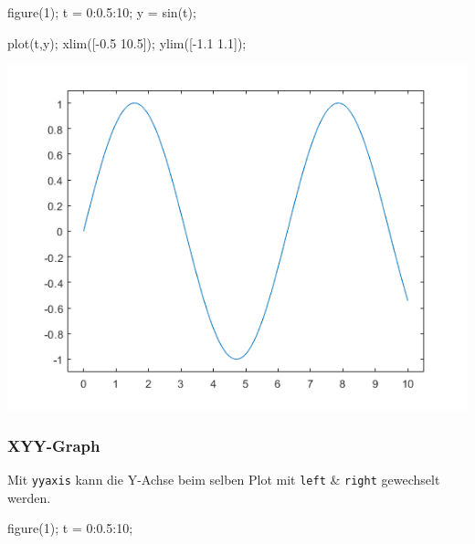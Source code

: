 \documentclass[
  10pt,
  a4paper,
  german]{article}
\newenvironment{Shaded}{}{}
\newcommand{\FloatTok}[1]{\textcolor[rgb]{0.00,0.36,0.77}{#1}}
\newcommand{\NormalTok}[1]{\textcolor[rgb]{0.14,0.16,0.18}{#1}}
\newcommand{\OperatorTok}[1]{\textcolor[rgb]{0.14,0.16,0.18}{#1}}
\newcommand{\VariableTok}[1]{\textcolor[rgb]{0.89,0.38,0.04}{#1}}
\numberwithin{equation}{section}
\begin{document}
\begin{multicols}{2}
\begin{Shaded}
\begin{Highlighting}[]
\VariableTok{figure}\NormalTok{(}\FloatTok{1}\NormalTok{)}\OperatorTok{;}
\VariableTok{t} \OperatorTok{=} \FloatTok{0}\OperatorTok{:}\FloatTok{0.5}\OperatorTok{:}\FloatTok{10}\OperatorTok{;}
\VariableTok{y} \OperatorTok{=} \VariableTok{sin}\NormalTok{(}\VariableTok{t}\NormalTok{)}\OperatorTok{;}

\VariableTok{plot}\NormalTok{(}\VariableTok{t}\OperatorTok{,}\VariableTok{y}\NormalTok{)}\OperatorTok{;}
\VariableTok{xlim}\NormalTok{([}\OperatorTok{{-}}\FloatTok{0.5} \FloatTok{10.5}\NormalTok{])}\OperatorTok{;}
\VariableTok{ylim}\NormalTok{([}\OperatorTok{{-}}\FloatTok{1.1} \FloatTok{1.1}\NormalTok{])}\OperatorTok{;}
\end{Highlighting}
\end{Shaded}

\includegraphics{images/plot_simple.png}

\hypertarget{xyy-graph}{%
\subsubsection{XYY-Graph}\label{xyy-graph}}

Mit \texttt{yyaxis} kann die Y-Achse beim selben Plot mit \texttt{left}
\& \texttt{right} gewechselt werden.

\begin{Shaded}
\begin{Highlighting}[]
\VariableTok{figure}\NormalTok{(}\FloatTok{1}\NormalTok{)}\OperatorTok{;}
\VariableTok{t} \OperatorTok{=} \FloatTok{0}\OperatorTok{:}\FloatTok{0.5}\OperatorTok{:}\FloatTok{10}\OperatorTok{;}


\end{Highlighting}
\end{Shaded}
\end{multicols}
\end{document}

